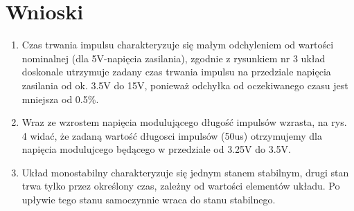 \documentclass[a4paper,12pt]{article}
\begin{document}
\section {Wnioski}
\begin{enumerate}  
\item Czas trwania impulsu charakteryzuje się małym odchyleniem od wartości nominalnej (dla 5V-napięcia zasilania),
      zgodnie z rysunkiem nr 3 układ doskonale utrzymuje zadany czas trwania impulsu na przedziale
      napięcia zasilania od ok. 3.5V do 15V, ponieważ odchyłka od oczekiwanego czasu jest mniejsza od 0.5\%.
\item Wraz ze wzrostem napięcia modulującego długość impulsów wzrasta, na rys. 4 widać, że 
      zadaną wartość długosci impulsów (50us) otrzymujemy dla napięcia modulujcego będącego w przedziale od
      3.25V do 3.5V.
\item Układ monostabilny charakteryzuje się jednym stanem stabilnym, drugi stan trwa tylko przez określony czas, zależny od wartości elementów układu. Po upływie tego stanu samoczynnie  wraca  do  stanu  stabilnego.
\end{enumerate}
\end{document}
